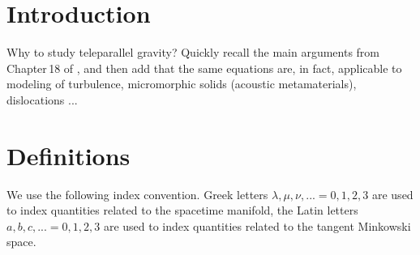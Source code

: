 \documentclass[
10pt, %
a4paper, %
oneside, %
headinclude,footinclude, %
BCOR5mm, %
]{scrartcl}
\begin{document}
\let\thefootnote\relax{}
\let\thefootnote\relax{}
\let\thefootnote\relax{}
\let\thefootnote\relax{}
\let\thefootnote\relax{}


\setlength\parindent{10pt} %
\setlength{\parskip}{5pt} %


\section{Introduction}

Why to study teleparallel gravity? Quickly recall the main arguments from Chapter\,18 of 
\cite{AldrovandiPereiraBook}, and then add that the same equations are, in fact, applicable to 
modeling of 
turbulence, micromorphic solids (acoustic metamaterials), dislocations \cite{PRD-Torsion2018}... 

\section{Definitions}

We use the following index convention. Greek letters $ \lambda,\mu,\nu,... =0,1,2,3
$ are used to index quantities related to the spacetime manifold, the Latin letters $ a,b,c,... 
=0,1,2,3$ are used to index quantities related to the tangent Minkowski space.
\end{document}
